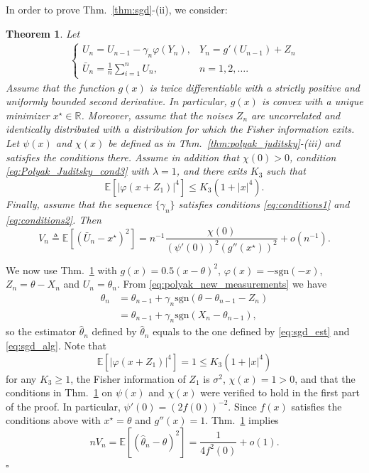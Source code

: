 \documentclass[letterpaper, conference, 11pt]{IEEEtran}      %
\newtheorem{thm}{\bf{Theorem}}
\newcommand{\sgn}{\mathrm{sgn} }
\newcommand*{\QEDA}{\hfill\ensuremath{\square}}
\begin{document}
In order to prove Thm.~\ref{thm:sgd}-(ii), we consider:
\begin{thm}{ \cite[Thm. 2]{polyak1990new}} \label{thm:polyak_new}
Let
\begin{align} \label{eq:polyak_new_measurements}
\begin{cases}
U_n = U_{n-1} - \gamma_n \varphi(Y_n), & Y_n = g'(U_{n-1})+Z_n \\
\bar{U}_n= \frac{1}{n} \sum_{i=1}^n U_n, & n=1,2,\ldots.
\end{cases}
\end{align}
Assume that the function $g(x)$ is twice differentiable with a strictly positive and uniformly bounded second derivative. In particular, $g(x)$ is convex with a unique minimizer $x^\star \in \mathbb R$. Moreover, assume that the noises $Z_n$ are uncorrelated and identically distributed with a distribution for which the Fisher information exits. Let $\psi(x)$ and $\chi(x)$ be defined as in Thm.~\ref{thm:polyak_juditsky}-(iii) and satisfies the conditions there. Assume in addition that $\chi(0)>0$, condition \eqref{eq:Polyak_Juditsky_cond3} with $\lambda = 1$, 
and there exits $K_3$ such that 
\[
\mathbb E \left[ | \varphi(x+Z_1) |^4 \right] \leq K_3(1+|x|^4). 
\]
Finally, assume that the sequence $\{\gamma_n \}$ satisfies conditions  \eqref{eq:conditions1} and \eqref{eq:conditions2}. Then
\[
V_n \triangleq \mathbb E \left[ \left(\bar{U}_n-x^\star \right)^2 \right] = n^{-1}\frac{\chi(0)} { (\psi'(0))^2 (g''(x^\star))^2 } + o(n^{-1}).
\]
\end{thm}

We now use Thm.~\ref{thm:polyak_new} with $g(x) = 0.5(x-\theta)^2$, $\varphi(x) = -\sgn(-x)$, $Z_n = \theta-X_n$ and $U_n = \theta_n$. From \eqref{eq:polyak_new_measurements} we have
\begin{align*} 
\theta_n & = \theta_{n-1} + \gamma_n \sgn(\theta-\theta_{n-1} - Z_n )  \\
& = \theta_{n-1} + \gamma_n \sgn(X_n-\theta_{n-1} ),
\end{align*}
so the estimator $\hat{\theta}_n$ defined by $\hat{\theta}_n$ equals to the one defined by \eqref{eq:sgd_est} and \eqref{eq:sgd_alg}. Note that
\[
\mathbb E \left[ | \varphi(x+Z_1) |^4 \right] = 1 \leq K_3(1+|x|^4)
\]
for any $K_3\geq 1$, the Fisher information of $Z_1$ is $\sigma^2$, $\chi(x) = 1 > 0$, and that 
the conditions in Thm.~\ref{thm:polyak_new} on $\psi(x)$ and $\chi(x)$ were verified to hold in the first part of the proof. In particular, $\psi'(0) = (2f(0))^{-2}$. Since $f(x)$ satisfies the conditions above with $x^\star = \theta$ and $g''(x) = 1$. Thm.~\ref{thm:polyak_new} implies 
\[
n V_n = \mathbb E \left[ \left(\hat{\theta}_n-\theta \right)^2 \right]  = \frac{1}{4 f^2(0)} + o(1).
\]
\QEDA
\end{document}
